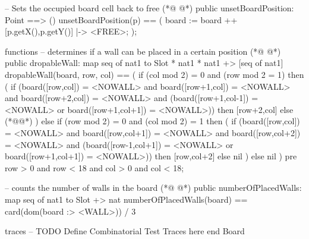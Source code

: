 \begin{vdmpp}[breaklines=true]
  -- Sets the occupied board cell back to free
(*@
\label{unsetBoardPosition:280}
@*)
  public unsetBoardPosition: Point ==> ()
  unsetBoardPosition(p) ==
  (
   board := board ++ {[p.getX(),p.getY()]  |-> <FREE>}; 
  );
  
  
functions
  -- determines if a wall can be placed in a certain position
(*@
\label{dropableWall:289}
@*)
  public dropableWall: map seq of nat1 to Slot * nat1 * nat1 +> [seq of nat1]
  dropableWall(board, row, col) == 
  (
   if (col mod 2) = 0 and (row mod 2 = 1)
   then (
    if (board([row,col]) = <NOWALL> and board([row+1,col]) = <NOWALL> and board([row+2,col]) = <NOWALL> and (board([row+1,col-1]) = <NOWALL> or board([row+1,col+1]) = <NOWALL>)) 
    then [row+2,col]
    else (*@@*)
   )
   else 
   if (row mod 2) = 0 and (col mod 2) = 1
   then (
    if (board([row,col]) = <NOWALL> and board([row,col+1]) = <NOWALL> and board([row,col+2]) = <NOWALL> and (board([row-1,col+1]) = <NOWALL> or board([row+1,col+1]) = <NOWALL>))
    then [row,col+2]
    else nil
   )
   else nil
  )
  pre row > 0 and row < 18 and col > 0 and col < 18;
  
  -- counts the number of walls in the board
(*@
\label{numberOfPlacedWalls:310}
@*)
  public numberOfPlacedWalls: map seq of nat1 to Slot +> nat
  numberOfPlacedWalls(board) ==
  card(dom(board :> {<WALL>})) / 3
 
traces
-- TODO Define Combinatorial Test Traces here  
end Board
\end{vdmpp}
\bigskip
